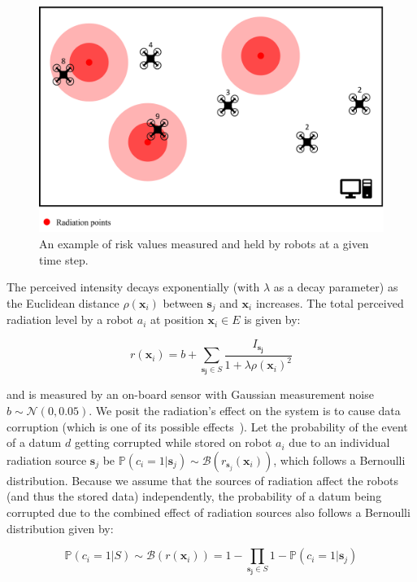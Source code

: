 \begin{figure}[htbp]
    \centering
    \includegraphics[width=0.9\columnwidth]{figures/dora_mesh/rass-risk.png}
    \caption[RASS Risk Measurement]{An example of risk values measured and held by robots at a given time step.}
    \label{rass_risk_measurement}
\end{figure}

The perceived intensity decays exponentially (with $\lambda$ as a decay parameter) as the 
Euclidean distance $\rho(\bm{x}_i)$ between $\bm{s}_j$ and $\bm{x}_i$ increases. The
total perceived radiation level by a robot $a_i$ at position $\bm{x}_i \in E$ is given by:

\begin{equation}
    r(\bm{x}_i) = b + \sum_{\bm{s_j} \in S} \frac{I_{\bm{s_j}}}{1 + \lambda\rho(\bm{x}_i)^2}
    \label{eq:radiation}
\end{equation}

and is measured by an on-board sensor with Gaussian measurement noise
$b \sim \mathcal{N}(0, 0.05)$. We posit the radiation's effect on the system is to cause 
data corruption (which is one of its possible effects~\cite{messenger1986effects}). Let the 
probability of the event of a datum $d$ getting corrupted while stored on robot $a_i$ due 
to an individual radiation  source $\bm{s}_j$ be
$\mathbb{P}(c_i = 1 | \bm{s}_j) \sim
\mathcal{B}(r_{\bm{s}_j}(\bm{x}_i))$, which follows a Bernoulli
distribution. Because we assume that the sources of radiation affect
the robots (and thus the stored data) independently, the probability of a datum being 
corrupted due to the combined effect of radiation sources also follows a Bernoulli 
distribution given by:

\begin{equation}
    \mathbb{P}(c_i = 1 | S) \sim \mathcal{B}(r(\bm{x}_i)) = 1 - \prod_{\bm{s_j} \in S}  1 - \mathbb{P}(c_i = 1 | \bm{s}_j)
    \label{eq:failure}
\end{equation}

